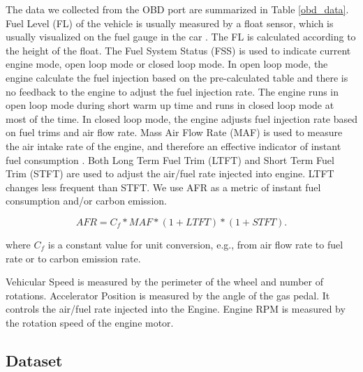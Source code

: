 The data we collected from the OBD port are summarized in Table \ref{obd_data}. 
Fuel Level (FL) of the vehicle is usually measured by a float sensor, 
which is usually visualized on the fuel gauge in the car \cite{fuel-gauge}.
The FL is calculated according to the height of the float. 
The Fuel System Status (FSS) is used to indicate current engine mode, 
open loop mode or closed loop mode. 
In open loop mode, 
the engine calculate the fuel injection based on the pre-calculated
table and there is no feedback to the engine to adjust the fuel injection rate. 
The engine runs in open loop mode during short warm up time
and runs in closed loop mode at most of the time. 
In closed loop mode, the engine adjusts fuel injection rate based on
fuel trims and air flow rate. 
Mass Air Flow Rate (MAF) is used to measure the air intake rate of the engine, 
and therefore an effective indicator of instant fuel consumption 
\cite{alessandrini2012consumption, lee2011estimation, koukoumidis2011signalguru}. 
Both Long Term Fuel Trim (LTFT) and Short Term Fuel Trim (STFT) are used to 
adjust the air/fuel rate injected into engine. 
LTFT changes less frequent than STFT. 
We use AFR as a metric of 
instant fuel consumption and/or carbon emission. 


\begin{equation}
AFR = C_f * MAF * (1 + LTFT) * (1 + STFT).
\end{equation}

where $C_f$ is a constant value for unit conversion, e.g., from air flow rate to
fuel rate or to carbon emission rate. 

Vehicular Speed is measured by the perimeter of the wheel and 
number of rotations. 
Accelerator Position is measured by the angle of the gas pedal.
It controls the air/fuel rate injected into the Engine.  
Engine RPM is measured by the rotation speed of the engine motor. 


\subsection{Dataset}


